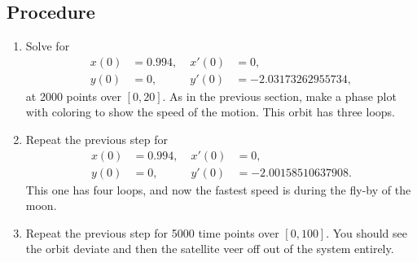 \documentclass[11pt,twoside]{article}
\begin{document}
\subsection*{Procedure}

\begin{enumerate}
  \item Solve for
  \begin{align*}
    x(0) &= 0.994, \; & x'(0) &= 0, \\
    y(0) &= 0, \; & y'(0) &= -2.03173262955734,
  \end{align*}
  at 2000 points over $[0,20]$. As in the previous section, make a phase plot with coloring to show the speed of the motion. This orbit has three loops.
  \item Repeat the previous step for  
      \begin{align*}
        x(0) &= 0.994, \; & x'(0) &= 0, \\
        y(0) &= 0, \; & y'(0) &= -2.00158510637908.
      \end{align*}
      This one has four loops, and now the fastest speed is during the fly-by of the moon.
  \item Repeat the previous step for 5000 time points over $[0,100]$. You should see the orbit deviate and then the satellite veer off out of the system entirely.
\end{enumerate}
\end{document}
